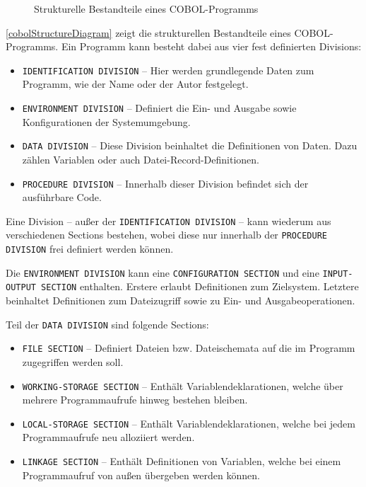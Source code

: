 \begin{figure}[H]
    \centering
    \resizebox{.9\linewidth}{!}{\unskip}
    \caption{Strukturelle Bestandteile eines COBOL-Programms \label{cobolStructureDiagram}}
\end{figure}

\autoref{cobolStructureDiagram} zeigt die strukturellen Bestandteile eines COBOL-Programms. 
Ein Programm kann besteht dabei aus vier fest definierten Divisions:

\begin{itemize}
    \item \texttt{IDENTIFICATION DIVISION} -- Hier werden grundlegende Daten zum Programm, wie der Name oder der Autor festgelegt.
    \item \texttt{ENVIRONMENT DIVISION} -- Definiert die Ein- und Ausgabe sowie Konfigurationen der Systemumgebung.
    \item \texttt{DATA DIVISION} -- Diese Division beinhaltet die Definitionen von Daten. Dazu zählen Variablen oder auch Datei-Record-Definitionen.
    \item \texttt{PROCEDURE DIVISION} -- Innerhalb dieser Division befindet sich der ausführbare Code.
\end{itemize}

Eine Division -- außer der \texttt{IDENTIFICATION DIVISION} -- kann wiederum aus verschiedenen Sections bestehen, wobei diese nur innerhalb der \texttt{PROCEDURE DIVISION} frei definiert werden können.

Die \texttt{ENVIRONMENT DIVISION} kann eine \texttt{CONFIGURATION SECTION} und eine \texttt{INPUT- OUTPUT SECTION} enthalten. Erstere erlaubt Definitionen zum Zielsystem. Letztere beinhaltet Definitionen zum Dateizugriff sowie zu Ein- und Ausgabeoperationen.

Teil der \texttt{DATA DIVISION} sind folgende Sections:
\begin{itemize}
    \item \texttt{FILE SECTION} -- Definiert Dateien bzw. Dateischemata auf die im Programm zugegriffen werden soll.
    \item \texttt{WORKING-STORAGE SECTION} -- Enthält Variablendeklarationen, welche über mehrere Programmaufrufe hinweg bestehen bleiben.
    \item \texttt{LOCAL-STORAGE SECTION} -- Enthält Variablendeklarationen, welche bei jedem Programmaufrufe neu alloziiert werden.
    \item \texttt{LINKAGE SECTION} -- Enthält Definitionen von Variablen, welche bei einem Programmaufruf von außen übergeben werden können.
\end{itemize}

